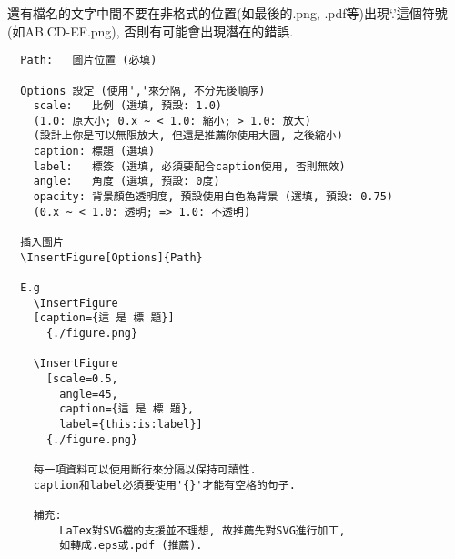 還有檔名的文字中間不要在非格式的位置(如最後的.png, .pdf等)出現`.'這個符號 (如AB.CD-EF.png), 否則有可能會出現潛在的錯誤.

\newpage
{}

  \begin{DescriptionFrame}
  \begin{verbatim}
  Path:   圖片位置 (必填)

  Options 設定 (使用','來分隔, 不分先後順序)
    scale:   比例 (選填, 預設: 1.0)
    (1.0: 原大小; 0.x ~ < 1.0: 縮小; > 1.0: 放大)
    (設計上你是可以無限放大, 但還是推薦你使用大圖, 之後縮小)
    caption: 標題 (選填)
    label:   標簽 (選填, 必須要配合caption使用, 否則無效)
    angle:   角度 (選填, 預設: 0度)
    opacity: 背景顏色透明度, 預設使用白色為背景 (選填, 預設: 0.75)
    (0.x ~ < 1.0: 透明; => 1.0: 不透明)

  插入圖片
  \InsertFigure[Options]{Path}

  E.g
    \InsertFigure
    [caption={這 是 標 題}]
      {./figure.png}

    \InsertFigure
      [scale=0.5,
        angle=45,
        caption={這 是 標 題},
        label={this:is:label}]
      {./figure.png}

    每一項資料可以使用斷行來分隔以保持可讀性.
    caption和label必須要使用'{}'才能有空格的句子.

    補充:
        LaTex對SVG檔的支援並不理想, 故推薦先對SVG進行加工,
        如轉成.eps或.pdf (推薦).
  \end{verbatim}
  \end{DescriptionFrame}

